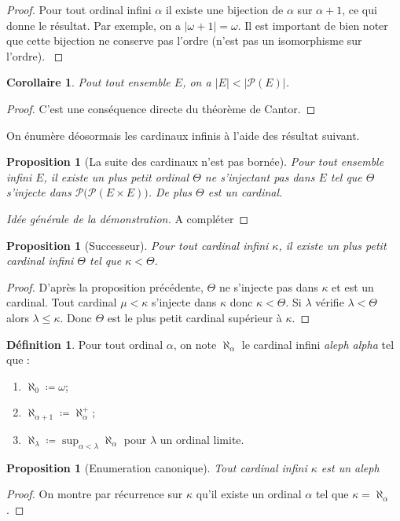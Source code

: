 \documentclass{article}
\theoremstyle{definition}
\newtheorem{definition}[subsubsection]{Définition}
\theoremstyle{plain}
\newtheorem{proposition}[subsubsection]{Proposition}
\theoremstyle{plain}
\newtheorem{corollary}[subsubsection]{Corollaire}
\theoremstyle{plain}
\theoremstyle{plain}
\theoremstyle{plain}
\begin{document}
\begin{proof}
	Pour tout ordinal infini \( \alpha \) il existe une bijection de \( \alpha \) sur \( \alpha + 1 \), ce qui donne le résultat. Par exemple, on a \( |\omega + 1| = \omega \). Il est important de bien noter que cette bijection ne conserve pas l'ordre (n'est pas un isomorphisme sur l'ordre). \cite{gowers2010ordinals}
\end{proof}

\begin{corollary}
	Pout tout ensemble \( E \), on a \( |E| < |\mathcal{P}(E)| \).
\end{corollary}
\begin{proof}
	C'est une conséquence directe du théorème de Cantor.
\end{proof}
\par On énumère déosormais les cardinaux infinis à l'aide des résultat suivant.

\begin{proposition}[La suite des cardinaux n'est pas bornée]
	Pour tout ensemble infini \( E \), il existe un plus petit ordinal \( \Theta \) ne s'injectant pas dans \( E \) tel que \( \Theta \) s'injecte dans \( \mathcal{P(\mathcal{P}}(E \times E))\). De plus \( \Theta \) est un cardinal.
\end{proposition}
\begin{proof}[Idée générale de la démonstration]
	A compléter
\end{proof}

\begin{proposition}[Successeur]
	Pour tout cardinal infini \( \kappa \), il existe un plus petit cardinal infini \( \Theta \) tel que \( \kappa < \Theta \).
\end{proposition}
\begin{proof}
	D'après la proposition précédente, \( \Theta \) ne s'injecte pas dans \( \kappa \) et est un cardinal. Tout cardinal \( \mu < \kappa \) s'injecte dans \( \kappa \) donc \( \kappa < \Theta \). Si \( \lambda \) vérifie \( \lambda <  \Theta \) alors \( \lambda \le \kappa \). Donc \( \Theta \) est le plus petit cardinal supérieur à \( \kappa \).  
\end{proof}

\clearpage

\begin{definition}
Pour tout ordinal \( \alpha \), on note \( \aleph_{\alpha} \) le cardinal infini \textit{aleph alpha} tel que :
	\begin{enumerate}[label = (\roman*) ]
		\item \( \aleph_{0} \coloneqq \omega \);
		\item \( \aleph_{\alpha + 1} \coloneqq \aleph_{\alpha}^{+} \);
		\item \( \aleph_{\lambda} \coloneqq \sup_{\alpha < \lambda} \aleph_{\alpha} \) pour \( \lambda \) un ordinal limite.
	\end{enumerate}
\end{definition}

\begin{proposition}[Enumeration canonique]
	Tout cardinal infini \( \kappa \) est un aleph
\end{proposition}

\begin{proof}
	On montre par récurrence sur \( \kappa \) qu'il existe un ordinal \( \alpha \) tel que \( \kappa = \aleph_{\alpha} \).
\end{proof}
\clearpage
\printbibliography
\end{document}
